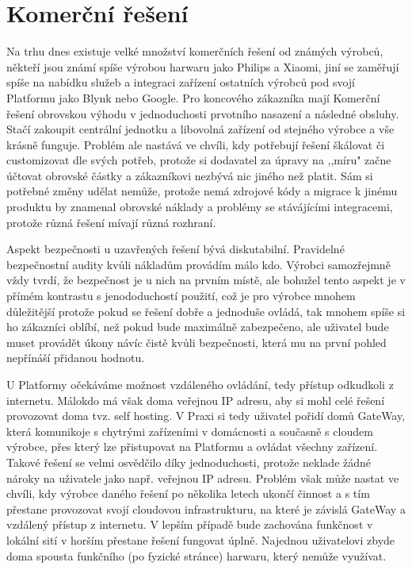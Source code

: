 \documentclass[thesis=B,czech]{FITthesis}[2019/12/23]
\begin{document}
\section{Komerční řešení} %
Na trhu dnes existuje velké množství komerčních řešení od známých výrobců, někteří jsou známí spíše výrobou harwaru jako Philips a Xiaomi, jiní se zaměřují spíše na nabídku služeb a integraci zařízení ostatních výrobců pod svojí Platformu jako Blynk nebo Google. Pro koncového zákazníka mají Komerční řešení obrovskou výhodu v jednoduchosti prvotního nasazení a následné obsluhy. Stačí zakoupit centrální jednotku a libovolná zařízení od stejného výrobce a vše krásně funguje. Problém ale nastává ve chvíli, kdy potřebují řešení škálovat či customizovat dle svých potřeb, protože si dodavatel za úpravy na ,,míru" začne účtovat obrovské částky a zákazníkovi nezbývá nic jiného než platit. Sám si potřebné změny udělat nemůže, protože nemá zdrojové kódy a migrace k jinému produktu by znamenal obrovské náklady a problémy se stávájícími integracemi, protože různá řešení mívají různá rozhraní.
  
Aspekt bezpečnosti u uzavřených řešení bývá diskutabilní. Pravidelné bezpečnostní audity kvůli nákladům provádím málo kdo. Výrobci samozřejmně vždy tvrdí, že bezpečnost je u nich na prvním místě, ale bohužel tento aspekt je v přímém kontrastu s jenododuchostí použití, což je pro výrobce mnohem důležitější protože pokud se řešení dobře a jednoduše ovládá, tak mnohem spíše si ho zákazníci oblíbí, než pokud bude maximálně zabezpečeno, ale uživatel bude muset provádět úkony návíc čistě kvůli bezpečnosti, která mu na první pohled nepřínáší přidanou hodnotu.

U Platformy očekáváme možnost vzdáleného ovládání, tedy přístup odkudkoli z internetu. Málokdo má však doma veřejnou IP adresu, aby si mohl celé řešení provozovat doma tvz. self hosting. V Praxi si tedy uživatel pořidí domů GateWay, která komunikoje s chytrými zařízeními v domácnosti a současně s cloudem výrobce, přes který lze přistupovat na Platformu a ovládat všechny zařízení. Takové řešení se velmi osvědčilo díky jednoduchosti, protože neklade žádné nároky na uživatele jako např. veřejnou IP adresu. Problém však může nastat ve chvíli, kdy výrobce daného řešení po několika letech ukončí činnost a s tím přestane provozovat svojí cloudovou infrastrukturu, na které je závislá GateWay a vzdálený přístup z internetu. V lepším případě bude zachována funkčnost v lokální sití v horším přestane řešení fungovat úplně. Najednou uživatelovi zbyde doma spousta funkčního (po fyzické stránce) harwaru, který nemůže využívat.
\end{document}
